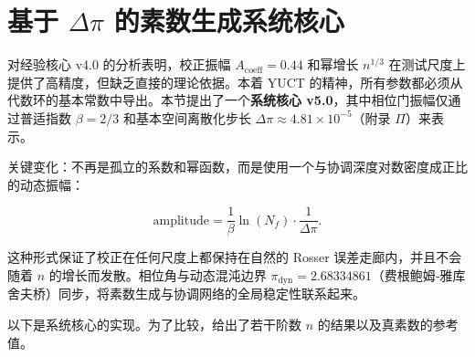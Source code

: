 \documentclass[11pt,a4paper]{article}
\begin{document}
	\small
	\section{基于 \(\Delta\pi\) 的素数生成系统核心}
	\label{sec:systemic-prime}
	
	对经验核心 v4.0 的分析表明，校正振幅 \(A_{\text{coeff}} = 0.44\) 和幂增长 \(n^{1/3}\) 在测试尺度上提供了高精度，但缺乏直接的理论依据。本着 YUCT 的精神，所有参数都必须从代数环的基本常数中导出。本节提出了一个\textbf{系统核心 v5.0}，其中相位门振幅仅通过普适指数 \(\beta = 2/3\) 和基本空间离散化步长 \(\Delta\pi \approx 4.81 \times 10^{-5}\)（附录 \(\Pi\)）来表示。
	
	关键变化：不再是孤立的系数和幂函数，而是使用一个与协调深度对数密度成正比的动态振幅：
	
	\[
	\text{amplitude} = \frac{1}{\beta} \ln(N_f) \cdot \frac{1}{\Delta\pi}.
	\]
	
	这种形式保证了校正在任何尺度上都保持在自然的 Rosser 误差走廊内，并且不会随着 \(n\) 的增长而发散。相位角与动态混沌边界 \(\pi_{\text{dyn}} = 2.68334861\)（费根鲍姆‑雅库舍夫桥）同步，将素数生成与协调网络的全局稳定性联系起来。
	
	以下是系统核心的实现。为了比较，给出了若干阶数 \(n\) 的结果以及真素数的参考值。
	
\end{document}
